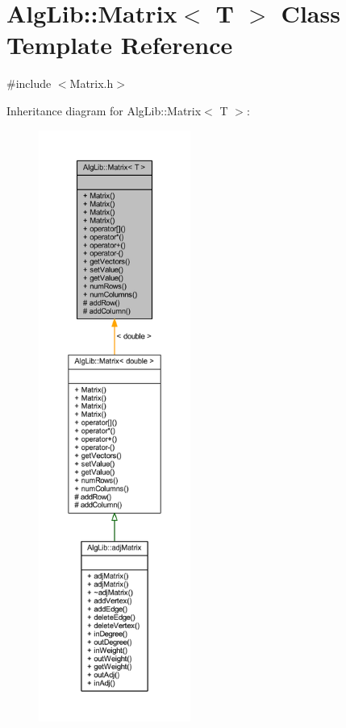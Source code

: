 \hypertarget{class_alg_lib_1_1_matrix}{}\section{Alg\+Lib\+:\+:Matrix$<$ T $>$ Class Template Reference}
\label{class_alg_lib_1_1_matrix}


{\ttfamily \#include $<$Matrix.\+h$>$}



Inheritance diagram for Alg\+Lib\+:\+:Matrix$<$ T $>$\+:\nopagebreak
\begin{figure}[H]
\begin{center}
\leavevmode
\includegraphics[height=550pt]{class_alg_lib_1_1_matrix__inherit__graph}
\end{center}
\end{figure}



